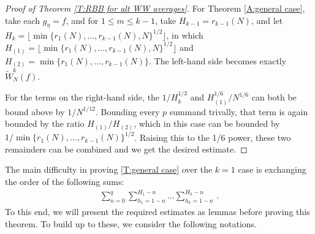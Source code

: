 \documentclass[11pt, oneside]{amsart}   	%
\newcommand{\1}{\mathbbm{1}}
\newcommand{\floor}[1]{\lfloor#1\rfloor}
\theoremstyle{definition}
\begin{document}
\begin{proof}[Proof of Theorem \ref{T:RBB for alt WW averages}]
For Theorem \ref{A:general case}, take each $g_\eta = f$, and for $1\leq m \leq k-1$, take $H_{k-1} = r_{k-1}(N)$, and let $H_k = \floor{\min\{r_1(N), \dots, r_{k-1}(N), N\}^{1/2}}$, in which $H_{(1)} = \floor{\min\{r_1(N), \dots, r_{k-1}(N), N\}^{1/2}}$ and $H_{(2)} = \min\{r_1(N), \dots, r_{k-1}(N)\}$. The left-hand side becomes exactly $\widetilde W_N^k(f)$. 

For the terms on the right-hand side, the  $1/H_k^{1/3}$ and $H_{(1)}^{1/6}/N^{1/6}$ can both be bound above by $1/N^{1/12}$. Bounding every $p$ summand trivally, that term is again bounded by the ratio $H_{(1)}/H_{(2)}$, which in this case can be bounded by $1/\min\{r_1(N), \dots, r_{k-1}(N)\}^{1/2}$. Raising this to the 1/6 power, these two remainders can be combined and we get the desired estimate.
\end{proof}




The main difficulty in proving \ref{T:general case} over the $k=1$ case is exchanging the order of the following sums:
\begin{align*}
    \sum_{n=0}^q \sum_{h_1 = 1-n}^{H_1-n} \dots \sum_{h_k = 1-n}^{H_k-n} \, .
\end{align*}
To this end, we will present the required estimates as lemmas before proving this theorem. To build up to these, we consider the following notations.
\end{document}
